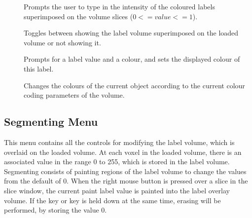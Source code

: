 \begin{description}
\item[]  Prompts the user to type in the
                      intensity of the coloured labels superimposed on the 
                      volume slices ($0 <= value <= 1$).
\item[]  Toggles between showing
                      the label volume superimposed on the loaded
                      volume or not showing it.
\item[]  Prompts for a
                      label value and a colour, and sets the displayed
                      colour of this label.
\item[]  Changes the
     colours of the current object according to the current colour
     coding parameters of the volume.
\end{description}

\subsection{Segmenting Menu}

This menu contains all the controls for modifying the label volume,
which is overlaid on the loaded volume.  At each voxel in the loaded
volume, there is an associated value in the range 0 to 255, which is
stored in the label volume.  Segmenting consists of painting regions
of the label volume to change the values from the default of 0.
When the right mouse button is pressed over a slice in the slice
window, the current paint label value is painted into the label overlay
volume.  If the  key or  key is held down
at the same time, erasing will be performed, by storing the value 0.

